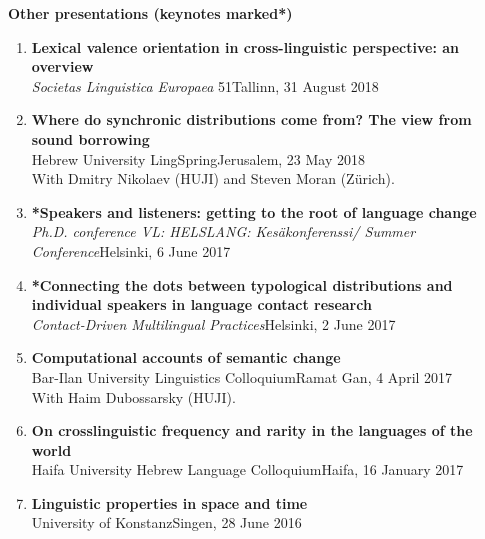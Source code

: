 \documentclass[letterpaper,11pt]{article}
\begin{document}
\begin{flushleft}\textbf{Other presentations (keynotes marked*)}
\end{flushleft}
\begin{enumerate}[resume]

\item \textbf{Lexical valence orientation in cross-linguistic perspective: an overview}\\\textit{Societas Linguistica Europaea} 51\hfill{Tallinn, 31 August 2018}

\item \textbf{Where do synchronic distributions come from? The view from sound borrowing}\\
Hebrew University LingSpring\hfill{Jerusalem, 23 May 2018}\\
With Dmitry Nikolaev (HUJI) and Steven Moran (Z\"urich).

\item \textbf{*Speakers and listeners: getting to the root of language change}\\
\textit{Ph.D. conference VL: HELSLANG: Kesäkonferenssi/ Summer Conference}\hfill{Helsinki, 6 June 2017} 

\item \textbf{*Connecting the dots between typological distributions and individual speakers in language contact research}\\\textit{Contact-Driven Multilingual Practices}\hfill{Helsinki, 2 June 2017}

\item \textbf{Computational accounts of semantic change}\\
Bar-Ilan University Linguistics Colloquium\hfill{Ramat Gan, 4 April 2017}\\
With Haim Dubossarsky (HUJI).
\item \textbf{On crosslinguistic frequency and rarity in the languages of the world}\\
Haifa University Hebrew Language Colloquium\hfill{Haifa, 16 January 2017}
\item \textbf{Linguistic properties in space and time}\\University of Konstanz\hfill{Singen, 28 June 2016}


\end{enumerate}
\end{document}
